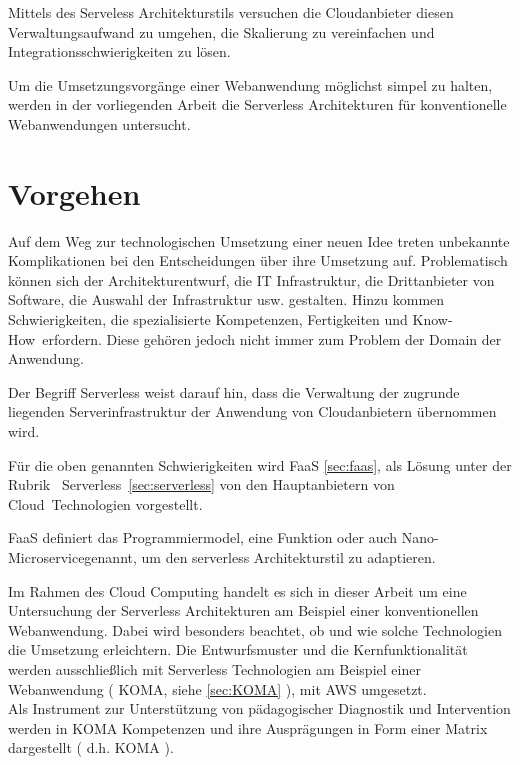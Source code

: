 \documentclass[
12pt,
english,
ngerman,
headsepline,
twoside,
openright,
numbers=noenddot,version=first
]{scrreprt}
\begin{document}
Mittels des Serveless Architekturstils versuchen die Cloudanbieter diesen Verwaltungsaufwand zu umgehen, die Skalierung zu vereinfachen und Integrationsschwierigkeiten zu lösen.


Um die Umsetzungsvorgänge einer Webanwendung möglichst simpel zu halten, werden in der vorliegenden Arbeit die Serverless Architekturen für konventionelle Webanwendungen untersucht.


\section{Vorgehen}
Auf dem Weg zur technologischen Umsetzung einer neuen Idee treten unbekannte Komplikationen
bei den Entscheidungen über ihre Umsetzung auf. Problematisch können sich der Architekturentwurf, die IT Infrastruktur, die Drittanbieter von Software, die Auswahl der Infrastruktur usw. gestalten. Hinzu kommen Schwierigkeiten, die spezialisierte Kompetenzen, Fertigkeiten und \glqq Know-How\grqq\ erfordern. Diese gehören jedoch nicht immer zum Problem der Domain der Anwendung.

Der Begriff Serverless weist darauf hin, dass die Verwaltung der zugrunde liegenden Serverinfrastruktur der Anwendung von Cloudanbietern übernommen wird. 

Für die oben genannten Schwierigkeiten wird \acrfull{FaaS} \autoref{sec:faas}, als Lösung unter der Rubrik \glqq\ Serverless\grqq\ \autoref{sec:serverless} von den Hauptanbietern von \glqq Cloud\grqq\ Technologien vorgestellt.

\acrshort{FaaS} definiert das Programmiermodel, eine Funktion oder auch \glqq Nano-Microservice\grqq genannt, um den serverless Architekturstil zu adaptieren.

Im Rahmen des Cloud Computing handelt es sich in dieser Arbeit um eine Untersuchung der Serverless Architekturen am Beispiel einer konventionellen Webanwendung. Dabei wird besonders beachtet, ob und wie solche Technologien die Umsetzung erleichtern. Die Entwurfsmuster und die Kernfunktionalität werden ausschließlich mit Serverless Technologien am Beispiel einer Webanwendung ( \acrfull{KOMA}, siehe \autoref{sec:KOMA} ), mit \acrshort{AWS} umgesetzt.\\
Als Instrument zur Unterstützung von pädagogischer Diagnostik und Intervention werden in \acrshort{KOMA} Kompetenzen und ihre Ausprägungen in Form einer Matrix dargestellt ( d.h. \acrshort{KOMA} ). 
\end{document}
